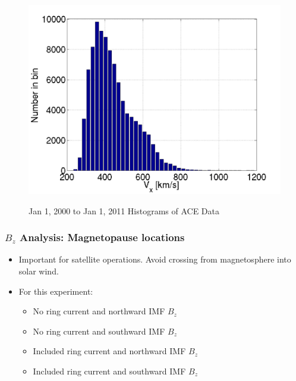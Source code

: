 \begin{frame}
\begin{figure}
		\includegraphics[scale=0.17]{images/hist_V.png}\\
		\caption{Jan 1, 2000 to Jan 1, 2011 Histograms of ACE Data }
\end{figure}
\end{frame}

\begin{frame}
\frametitle{$B_z$ Analysis: Magnetopause locations}
\begin{itemize}
  \item Important for satellite operations. Avoid crossing from magnetosphere
  into solar wind.
  \item For this experiment:
  \begin{itemize}
    \item No ring current and northward IMF $B_z$
    \item No ring current and southward IMF $B_z$
    \item Included ring current and northward IMF $B_z$
    \item Included ring current and southward IMF $B_z$
  \end{itemize}
\end{itemize}
\end{frame}

